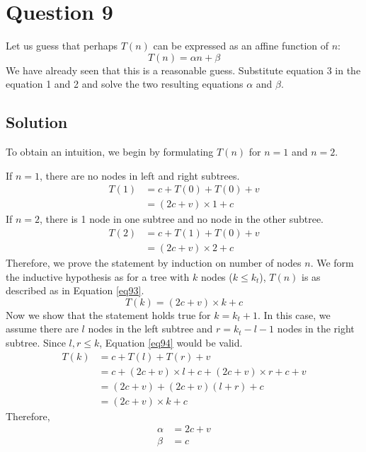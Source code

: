
\section*{Question 9}
Let us guess that perhaps $T(n)$ can be expressed as an affine function of $n$:
\begin{equation}
T(n) = \alpha n + \beta
\end{equation}
We have already seen that this is a reasonable guess. Substitute equation 3 in the equation 1 and 2 and solve the two resulting equations $\alpha$ and $\beta$.
\subsection*{Solution}
To obtain an intuition, we begin by formulating $T(n)$ for $n = 1$ and $n=2$.

If $n = 1$, there are no nodes in left and right subtrees.
\begin{equation}
\begin{aligned}
T(1) &= c + T(0) + T(0) + v\\
&= (2c + v) \times 1 + c
\end{aligned}
\end{equation}
If $n = 2$, there is 1 node in one subtree and no node in the other subtree.
\begin{equation}
\begin{aligned}
T(2) &= c + T(1) + T(0) + v\\
&= (2c + v) \times 2 + c
\end{aligned}
\end{equation}
Therefore, we prove the statement by induction on number of nodes $n$. We form the inductive hypothesis as for a tree with $k$ nodes ($k \leq k_t$), $T(n)$ is as described as in Equation \ref{eq93}.
\begin{equation}
T(k) = (2c + v) \times k + c
\label{eq93}
\end{equation}
Now we show that the statement holds true for $k = k_t + 1$. In this case, we assume there are $l$ nodes in the left subtree and $r = k_t - l - 1$ nodes in the right subtree. Since $l, r \leq k$, Equation \ref{eq94} would be valid.
\begin{equation}
\begin{aligned}
T(k) &= c + T(l) + T(r) + v\\
&= c + (2c + v) \times l + c + (2c + v) \times r + c + v\\
&= (2c + v) + (2c + v)(l + r) + c\\
&= (2c + v) \times k + c
\end{aligned}\label{eq94}
\end{equation}
Therefore,
\begin{align}
\alpha &= 2c + v\\
\beta &= c
\end{align}\label{eq95}

